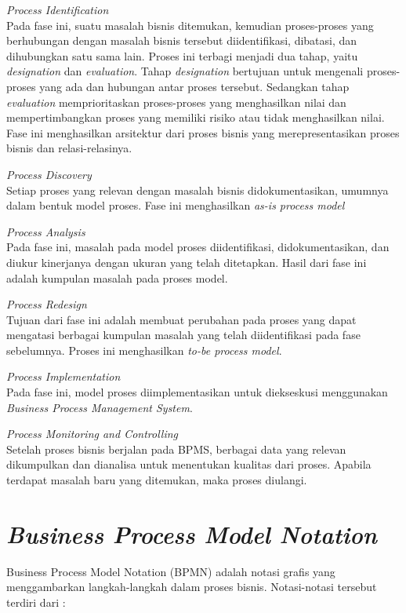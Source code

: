 \begin{description}
	\item{\textit{Process Identification}} \hfill \\ Pada fase ini, suatu masalah bisnis ditemukan, kemudian proses-proses yang berhubungan dengan masalah bisnis tersebut diidentifikasi, dibatasi, dan dihubungkan satu sama lain. Proses ini terbagi menjadi dua tahap, yaitu \textit{designation} dan \textit{evaluation}. Tahap \textit{designation} bertujuan untuk mengenali proses-proses yang ada dan hubungan antar proses tersebut. Sedangkan tahap \textit{evaluation} memprioritaskan proses-proses yang menghasilkan nilai dan mempertimbangkan proses yang memiliki risiko atau tidak menghasilkan nilai. Fase ini menghasilkan arsitektur dari proses bisnis yang merepresentasikan proses bisnis dan relasi-relasinya.   
	\item{\textit{Process Discovery}} \hfill \\ Setiap proses yang relevan dengan masalah bisnis didokumentasikan, umumnya dalam bentuk model proses. Fase ini menghasilkan \textit{as-is process model}
	\item{\textit{Process Analysis}} \hfill \\ Pada fase ini, masalah pada model proses diidentifikasi, didokumentasikan, dan diukur kinerjanya dengan ukuran yang telah ditetapkan. Hasil dari fase ini adalah kumpulan masalah pada proses model.
	\item{\textit{Process Redesign}} \hfill \\ Tujuan dari fase ini adalah membuat perubahan pada proses yang dapat mengatasi berbagai kumpulan masalah yang telah diidentifikasi pada fase sebelumnya. Proses ini menghasilkan \textit{to-be process model}.
	\item{\textit{Process Implementation}} \hfill \\ Pada fase ini, model proses diimplementasikan untuk diekseskusi menggunakan \textit{Business Process Management System}.
	\item{\textit{Process Monitoring and Controlling}} \hfill \\ Setelah proses bisnis berjalan pada BPMS, berbagai data yang relevan dikumpulkan dan dianalisa untuk menentukan kualitas dari proses. Apabila terdapat masalah baru yang ditemukan, maka proses diulangi.
\end{description}



\section{\textit{Business Process Model Notation}}
\label{sec:bpmn}
Business Process Model Notation (BPMN) adalah notasi grafis yang menggambarkan langkah-langkah dalam proses bisnis. Notasi-notasi tersebut terdiri dari :

